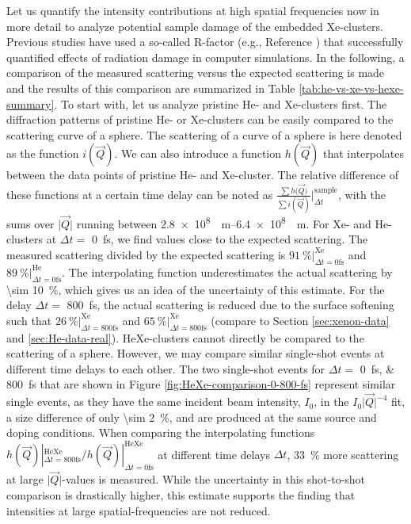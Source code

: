 %
Let us quantify the intensity contributions at high spatial frequencies now in more detail to analyze potential sample damage of the embedded Xe-clusters. Previous studies have used a so-called R-factor (e.g., Reference \cite{Neutze-2000-Nature,Hau-Riege-2008-PRE}) that successfully quantified effects of radiation damage in computer simulations. In the following, a comparison of the measured scattering versus the expected scattering is made and the results of this comparison are summarized in Table \ref{tab:he-vs-xe-vs-hexe-summary}. To start with, let us analyze pristine He- and Xe-clusters first. The diffraction patterns of pristine He- or Xe-clusters can be easily compared to the scattering curve of a sphere. The scattering of a curve of a sphere is here denoted as the function $i(\vec{Q})$. We can also introduce a function $h(\vec{Q})$ that interpolates between the data points of pristine He- and Xe-cluster. The relative difference of these functions at a certain time delay can be noted as $\tfrac{\sum{h(\vec{Q}})}{\sum{i(\vec{Q})}}|_{\Delta t}^{\text{sample}}$, with the sums over $\lvert \vec{Q}\rvert$ running between \SIrange[scientific-notation = fixed, fixed-exponent = 8]{2.8e8}{6.4e8}{\per\meter}. For Xe- and He-clusters at $\Delta t =$ \SI{0}{\femto\second}, we find values close to the expected scattering. The measured scattering divided by the expected scattering is $\SI{91}{\percent} |_{\Delta t = 0 \text{fs}}^{\text{Xe}}$ and $\SI{89}{\percent}|_{\Delta t=0 \text{fs}}^{\text{He}}$. The interpolating function underestimates the actual scattering by \SI{\sim 10}{\percent}, which gives us an idea of the uncertainty of this estimate. For the delay $\Delta t=$ \SI{800}{\femto\second}, the actual scattering is reduced due to the surface softening such that $\SI{26}{\percent} |_{\Delta t = 800 \text{fs}}^{\text{Xe}}$ and $\SI{65}{\percent} |_{\Delta t = 800 \text{fs}}^{\text{Xe}}$ (compare to Section \ref{sec:xenon-data} and \ref{sec:He-data-real}). HeXe-clusters cannot directly be compared to the scattering of a sphere. However, we may compare similar single-shot events at different time delays to each other. The two single-shot events for $\Delta t=$ \SIlist{0;800}{\femto\second} that are shown in Figure \ref{fig:HeXe-comparison-0-800-fs} represent similar single events, as they have the same incident beam intensity, $I_{0}$, in the $I_{0} \lvert\vec{Q}\rvert^{-4}$ fit, a size difference of only \SI{\sim 2}{\percent}, and are produced at the same source and doping conditions. When comparing the interpolating functions $h(\vec{Q}) |_{\Delta t = 800 \text{fs}}^{\text{HeXe}}/h(\vec{Q}) |_{\Delta t = 0 \text{fs}}^{\text{HeXe}}$ at different time delays $\Delta t$, \SI{33}{\percent} more scattering at large $\lvert\vec{Q}\rvert$-values is measured. While the uncertainty in this shot-to-shot comparison is drastically higher, this estimate supports the finding that intensities at large spatial-frequencies are not reduced.\\[1\baselineskip] 
